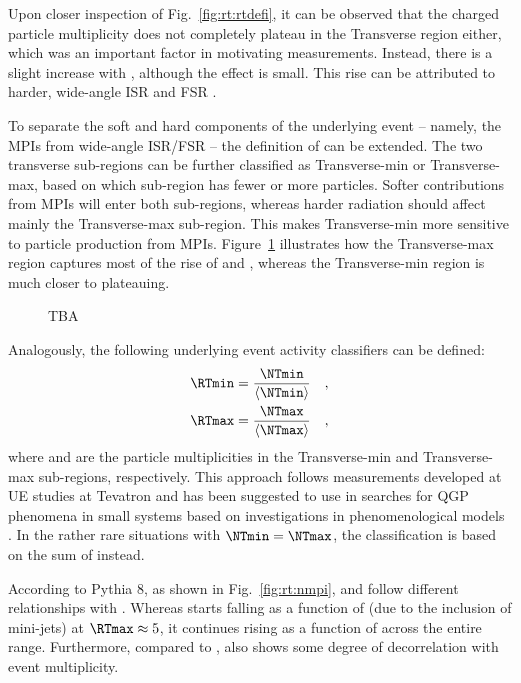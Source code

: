 Upon closer inspection of Fig.~\ref{fig:rt:rtdefi}, it can be observed that the charged particle multiplicity does not completely plateau in the Transverse region either, which was an important factor in motivating \RT measurements. Instead, there is a slight increase with \ptlead, although the effect is small. This rise can be attributed to harder, wide-angle ISR and FSR \cite{fieldUnderlyingEventHadronic2012}.

To separate the soft and hard components of the underlying event -- namely, the MPIs from wide-angle ISR/FSR -- the definition of \RT can be extended. The two transverse sub-regions can be further classified as Transverse-min or Transverse-max, based on which sub-region has fewer or more particles. Softer contributions from MPIs will enter both sub-regions, whereas harder radiation should affect mainly the Transverse-max sub-region. This makes Transverse-min more sensitive to particle production from MPIs. Figure~\ref{fig:rt:ue} illustrates how the Transverse-max region captures most of the rise of \meanNch and \meanpt, whereas the Transverse-min region is much closer to plateauing.

\begin{figure}%
\caption{TBA}
\label{fig:rt:ue}
\end{figure}

Analogously, the following underlying event activity classifiers can be defined:
\begin{align}
\RTmin &= \frac{\NTmin}{\langle \NTmin \rangle} \quad, \\
\RTmax &= \frac{\NTmax}{\langle \NTmax \rangle} \quad,
\end{align}
where \NTmin and \NTmax are the particle multiplicities in the Transverse-min and Transverse-max sub-regions, respectively. This approach follows measurements developed at UE studies at Tevatron \cite{fieldUnderlyingEventHadronic2012} and has been suggested to use in searches for QGP phenomena in small systems based on investigations in phenomenological models \cite{bencediDisentanglingHardGluon2021}. In the rather rare situations with $\NTmin = \NTmax$, the classification is based on the sum of \pt instead.

According to Pythia 8, as shown in Fig.~\ref{fig:rt:nmpi}, \RTmin and \RTmax follow different relationships with \meannmpi. Whereas \meannmpi starts falling as a function of \RTmax (due to the inclusion of mini-jets) at $\RTmax \approx 5$, it continues rising as a function of \RTmin across the entire range. Furthermore, compared to \RT, \RTmin also shows some degree of decorrelation with event multiplicity.


